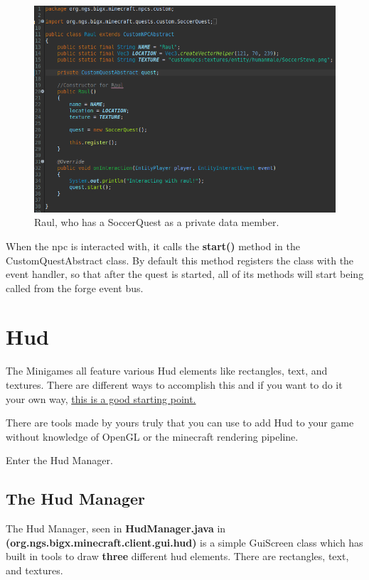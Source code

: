\documentclass[12pt]{article}
\begin{document}
\begin{figure}[H]
	\caption{Raul, who has a SoccerQuest as a private data member.}
	\includegraphics[scale=0.3]{images/quests/RaulQuest.png}
	\centering
\end{figure}

When the npc is interacted with, it calls the {\bfseries start()} method in the CustomQuestAbstract class. By default this method registers the class with the event handler, so that after the quest is started, all of its methods will start being called from the forge event bus.


\section{Hud}
\label{sec:hud}

The Minigames all feature various Hud elements like rectangles, text, and textures. There are different ways to accomplish this and if you want to do it your own way, \href {https://jabelarminecraft.blogspot.com/p/minecraft-modding-block-with-simple-gui.html}{this is a good starting point.}

There are tools made by yours truly that you can use to add Hud to your game without knowledge of OpenGL or the minecraft rendering pipeline.

Enter the Hud Manager.

\subsection{The Hud Manager}

The Hud Manager, seen in {\bfseries HudManager.java} in {\bfseries (org.ngs.bigx.minecraft.client.gui.hud)} is a simple GuiScreen class which has built in tools to draw {\bfseries three} different hud elements. There are rectangles, text, and textures.
\end{document}

